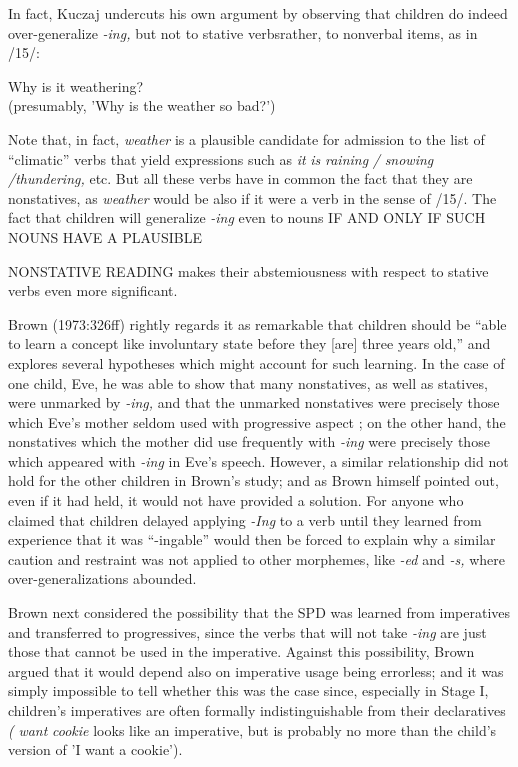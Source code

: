 In fact, Kuczaj undercuts his own argument by observing that children do indeed over-generalize \textit{-ing,} but not to stative verbs\-rather, to nonverbal items, as in /15/:

\ea\label{ex:15}
 Why is it weathering?\\
(presumably, 'Why is the weather so bad?')
\z




Note that, in fact, \textit{weather} is a plausible candidate for admission to the list of ``climatic'' verbs that yield expressions such as \textit{it} \textit{is} \textit{raining} \textit{/} \textit{snowing} \textit{/thundering, }etc. But all these verbs have in common the fact that they are nonstatives, as \textit{weather }would be also if it were a verb in the sense of /15/. The fact that children will generalize \textit{-ing} even to nouns IF AND ONLY IF SUCH NOUNS HAVE A PLAUSIBLE

NONSTATIVE READING makes their abstemiousness with respect to stative verbs even more significant.

Brown (1973:326ff) rightly regards it as remarkable that chil\-dren should be ``able to learn a concept like involuntary state before they [are] three years old,'' and explores several hypotheses which might account for such learning. In the case of one child, Eve, he was able to show that many nonstatives, as well as statives, were unmarked by \textit{-ing,} and that the unmarked nonstatives were precisely those which Eve's mother seldom used with progressive aspect ; on the other hand, the nonstatives which the mother did use frequently with \textit{-ing} were precisely those which appeared with \textit{-ing }in Eve's speech. However, a similar relationship did not hold for the other children in Brown's study; and as Brown himself pointed out, even if it had held, it would not have provided a solution. For anyone who claimed that children delayed applying \textit{-I}\textit{n}\textit{g} to a verb until they learned from experience that it was ``-ingable'' would then be forced to explain why a similar caution and restraint was not applied to other morphemes, like \textit{-ed }and \textit{-s,} where over-generalizations abounded.

Brown next considered the possibility that the SPD was learned from imperatives and transferred to progressives, since the verbs that will not take \textit{-ing} are just those that cannot be used in the imperative. Against this possibility, Brown argued that it would depend also on imperative usage being errorless; and it was simply impossible to tell whether this was the case since, especially in Stage I, children's impera\-tives are often formally indistinguishable from their declaratives \textit{(} \textit{want} \textit{cookie} looks like an imperative, but is probably no more than the child's version of 'I want a cookie').

